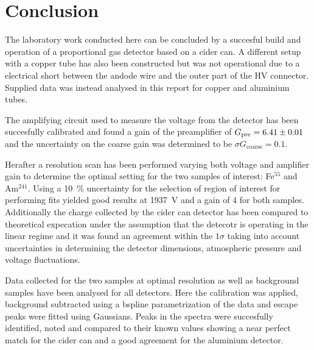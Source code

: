 \section{Conclusion}
The laboratory work conducted here can be concluded by a succesful build and
operation of a proportional gas detector based on a cider can. A different setup
with a copper tube has also been constructed but was not operational due to a
electrical short between the andode wire and the outer part of the HV connector.
Supplied data was instead analysed in this report for copper and aluminium
tubes.

The amplifying circuit used to measure the voltage from the detector has been
succesfully calibrated and found a gain of the preamplifier of
$G_\mathrm{pre}=\SI{6.41 \pm 0.01}{}$ and the uncertainty on the coarse gain was
determined to be $\sigma G_\mathrm{coarse} = 0.1$.

Herafter a resolution scan has been performed varying both voltage and amplifier
gain to determine the optimal setting for the two samples of interest: Fe$^{55}$
and Am$^{241}$. Using a \SI{10}{\percent} uncertainty for the selection of
region of interest for performing fits yielded good results at \SI{1937}{\volt}
and a gain of $4$ for both samples. Additionally the charge collected by the
cider can detector has been compared to theoretical expecation under the
assumption that the detecotr is operating in the linear regime and it was found
an agreement within the $1\sigma$ taking into account uncertainties in
determining the detector dimensions, atmospheric pressure and voltage fluctuations.

Data collected for the two samples at optimal resolution as well as background samples have
been analysed for all detectors. Here the calibration was applied, background
subtracted using a bspline parametrization of the data and escape peaks were fitted using
Gaussians. Peaks in the spectra were succesfully identified, noted and compared
to their known values showing a near perfect match for the cider can and a good
agreement for the aluminium detector.